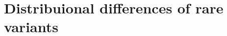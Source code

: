 \chapter{Distribuional differences of rare variants}
\label{cha:distribuional_differences_of_rare_variants}



